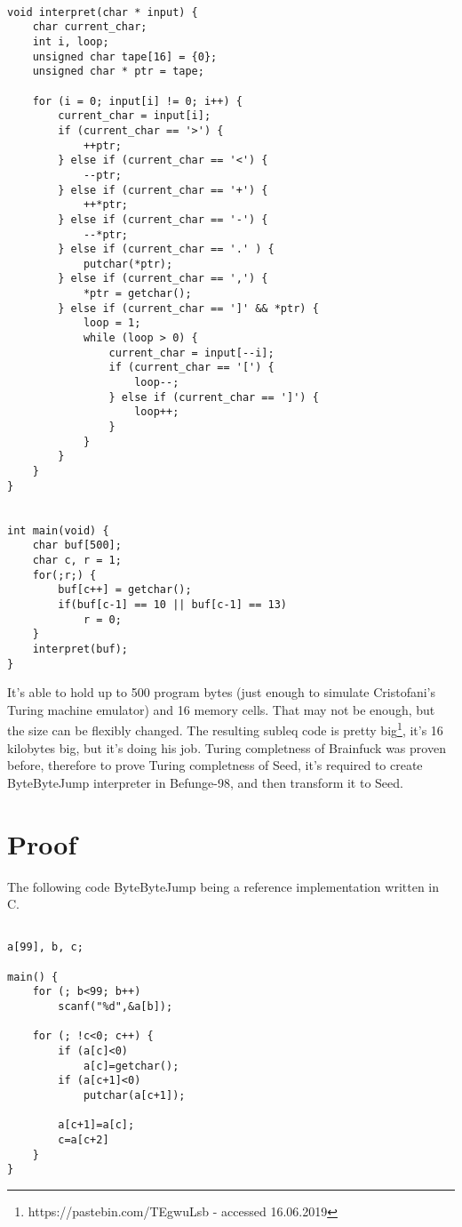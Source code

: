 \documentclass{article}
\begin{document}
\begin{verbatim}

void interpret(char * input) {
    char current_char;
    int i, loop;
    unsigned char tape[16] = {0};
    unsigned char * ptr = tape;

    for (i = 0; input[i] != 0; i++) {
        current_char = input[i];
        if (current_char == '>') {
            ++ptr;
        } else if (current_char == '<') {
            --ptr;
        } else if (current_char == '+') {
            ++*ptr;
        } else if (current_char == '-') {
            --*ptr;
        } else if (current_char == '.' ) {
            putchar(*ptr);
        } else if (current_char == ',') {
            *ptr = getchar();
        } else if (current_char == ']' && *ptr) {
            loop = 1;
            while (loop > 0) {
                current_char = input[--i];
                if (current_char == '[') {
                    loop--;
                } else if (current_char == ']') {
                    loop++;
                }
            }
        }
    }
}


int main(void) {
    char buf[500];
    char c, r = 1;
    for(;r;) {
        buf[c++] = getchar();
        if(buf[c-1] == 10 || buf[c-1] == 13)
            r = 0;
    }
    interpret(buf);
}

\end{verbatim}

\par It's able to hold up to 500 program bytes (just enough to simulate Cristofani's Turing machine emulator) and 16 memory cells. That may not be enough, but the size can be flexibly changed. The resulting subleq code is pretty big\footnote{https://pastebin.com/TEgwuLsb - accessed 16.06.2019}, it's 16 kilobytes big, but it's doing his job. Turing completness of Brainfuck was proven before, therefore to prove Turing completness of Seed, it's required to create ByteByteJump interpreter in Befunge-98, and then transform it to Seed.

\section{Proof}

\par The following code ByteByteJump being a reference implementation written in C.

\begin{verbatim}

a[99], b, c;

main() {
    for (; b<99; b++)
        scanf("%d",&a[b]);
    
    for (; !c<0; c++) {
        if (a[c]<0)
            a[c]=getchar(); 
        if (a[c+1]<0)
            putchar(a[c+1]);
        
        a[c+1]=a[c];
        c=a[c+2]
    }
}

\end{verbatim}
\end{document}
